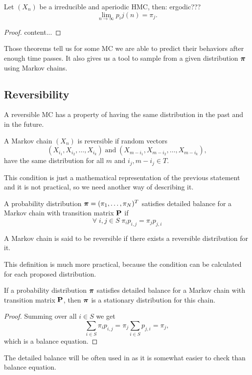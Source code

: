 	\begin{theorem}
		Let $(X_n)$ be a irreducible and aperiodic HMC, then: ergodic???
		\begin{equation*}
			\lim_{n \rightarrow \infty} p_ij(n) = \pi_j.
		\end{equation*}
	\end{theorem}
	\begin{proof}
		content...
	\end{proof}
	
	Those theorems tell us for some MC we are able to predict their behaviors after enough time passes. It also gives us a tool to sample from a given distribution $\boldsymbol{\pi}$ using Markov chains.
	
\subsection{Reversibility}
	A reversible MC has a property of having the same distribution in the past and in the future.
	\begin{definition}[Reversibility]
		A Markov chain $(X_n)$ is reversible if random vectors
		\begin{equation*}
			(X_{i_1}, X_{i_2}, \ldots, X_{i_k}) \; \mathrm{and} \; (X_{m-i_1}, X_{m-i_2}, \ldots, X_{m-i_k}),
		\end{equation*}
		have the same distribution for all $m$ and $i_j, m-i_j \in T$.
	\end{definition}
	
	This condition is just a mathematical representation of the previous statement and it is not practical, so we need another way of describing it.
	\begin{definition}
		A probability distribution $\boldsymbol{\pi} = (\pi_1, \ldots, \pi_N)^T$ satisfies detailed balance for a Markov chain with transition matrix $\mathbf{P}$ if
		\begin{equation*}
			\forall \; i,j \in S \; \pi_i p_{i,j} = \pi_j p_{j,i}
		\end{equation*}
	\end{definition}
	
	\begin{definition}
		A Markov chain is said to be reversible if there exists a reversible distribution for it.
	\end{definition}

	This definition is much more practical, because the condition can be calculated for each proposed distribution.
	
	\begin{theorem}
		If a probability distribution $\boldsymbol{\pi}$ satisfies detailed balance for a Markov chain with transition matrix $\mathbf{P}$, then $\boldsymbol{\pi}$ is a stationary distribution for this chain.
	\end{theorem}
	\begin{proof}
		Summing over all $i \in S$ we get
		\begin{equation*}
			\sum_{i \in S} \pi_i p_{i,j} = \pi_j \sum_{i \in S} p_{j,i} = \pi_j,
		\end{equation*}
		which is a balance equation.
	\end{proof}

	The detailed balance will be often used in as it is somewhat easier to check than balance equation.
	
	
	